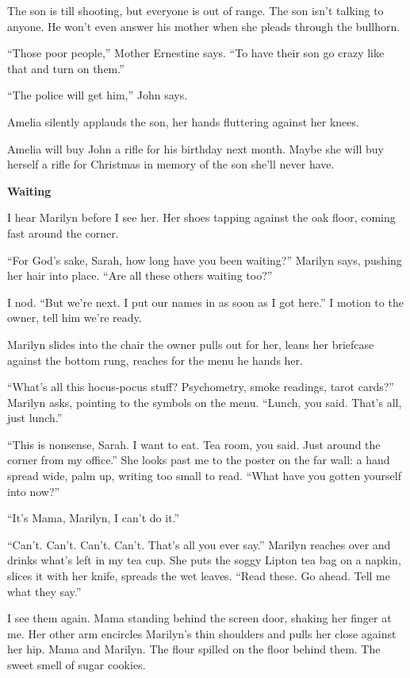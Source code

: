 \documentclass[
]{article}
\begin{document}
The son is till shooting, but everyone is out of range. The son isn't
talking to anyone. He won't even answer his mother when she pleads
through the bullhorn.

``Those poor people,'' Mother Ernestine says. ``To have their son go
crazy like that and turn on them.''

``The police will get him,'' John says.

Amelia silently applauds the son, her hands fluttering against her
knees.

Amelia will buy John a rifle for his birthday next month. Maybe she will
buy herself a rifle for Christmas in memory of the son she'll never
have.\textbf{\hfill\break
}

\textbf{Waiting}

I hear Marilyn before I see her. Her shoes tapping against the oak
floor, coming fast around the corner.

``For God's sake, Sarah, how long have you been waiting?'' Marilyn says,
pushing her hair into place. ``Are all these others waiting too?''

I nod. ``But we're next. I put our names in as soon as I got here.'' I
motion to the owner, tell him we're ready.

Marilyn slides into the chair the owner pulls out for her, leans her
briefcase against the bottom rung, reaches for the menu he hands her.

``What's all this hocus-pocus stuff? Psychometry, smoke readings, tarot
cards?'' Marilyn asks, pointing to the symbols on the menu. ``Lunch, you
said. That's all, just lunch.''

``This is nonsense, Sarah. I want to eat. Tea room, you said. Just
around the corner from my office.'' She looks past me to the poster on
the far wall: a hand spread wide, palm up, writing too small to read.
``What have you gotten yourself into now?''

``It's Mama, Marilyn, I can't do it.''

``Can't. Can't. Can't. Can't. That's all you ever say.'' Marilyn reaches
over and drinks what's left in my tea cup. She puts the soggy Lipton tea
bag on a napkin, slices it with her knife, spreads the wet leaves.
``Read these. Go ahead. Tell me what they say.''

I see them again. Mama standing behind the screen door, shaking her
finger at me. Her other arm encircles Marilyn's thin shoulders and pulls
her close against her hip. Mama and Marilyn. The flour spilled on the
floor behind them. The sweet smell of sugar cookies.
\end{document}
